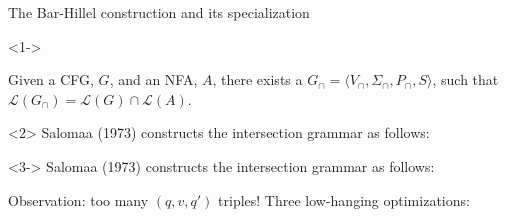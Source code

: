 \documentclass{beamer}
\begin{document}
\begin{frame}[t,fragile]{The Bar-Hillel construction and its specialization}
  \begin{onlyenv}<1->\vspace{-0.2cm}
  \begin{theorem}
    Given a CFG, $G$, and an NFA, $A$, there exists a $G_\cap = \langle V_\cap, \Sigma_\cap, P_\cap, S\rangle$, such that $\mathcal{L}(G_\cap) = \mathcal{L}(G) \cap \mathcal{L}(A)$.
  \end{theorem}
  \end{onlyenv}
  \begin{onlyenv}<2>
  Salomaa (1973) constructs the intersection grammar as follows:\vspace{-0.1cm}

  \noindent{}
  \end{onlyenv}

  \begin{onlyenv}<3->
  Salomaa (1973) constructs the intersection grammar as follows:\vspace{-0.1cm}

  \noindent{}
  Observation: too many $(q, v, q')$ triples! Three low-hanging optimizations:


\end{onlyenv}
\end{frame}
\end{document}

